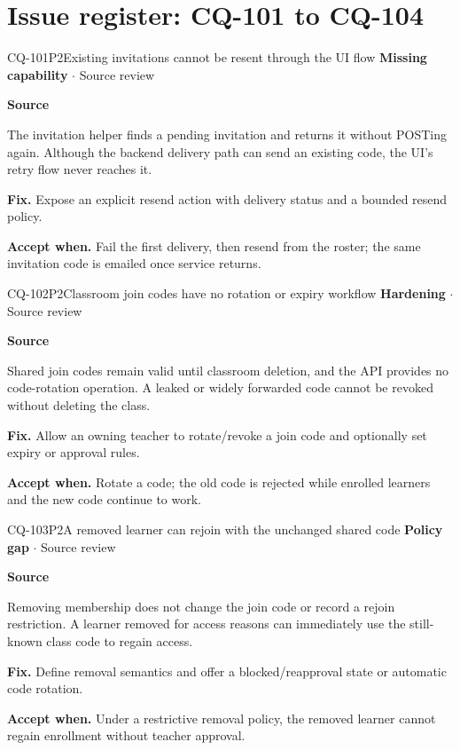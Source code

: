 \section*{Issue register: CQ-101 to CQ-104}
\begin{finding}{CQ-101}{P2}{Existing invitations cannot be resent through the UI flow}
\textbf{Missing capability} $\cdot$ Source review\par
\textbf{Source}\quad{}\par
The invitation helper finds a pending invitation and returns it without POSTing again. Although the backend delivery path can send an existing code, the UI's retry flow never reaches it.\par
\textbf{Fix.} Expose an explicit resend action with delivery status and a bounded resend policy.\par
\textbf{Accept when.} Fail the first delivery, then resend from the roster; the same invitation code is emailed once service returns.
\end{finding}
\begin{finding}{CQ-102}{P2}{Classroom join codes have no rotation or expiry workflow}
\textbf{Hardening} $\cdot$ Source review\par
\textbf{Source}\quad{}\par
Shared join codes remain valid until classroom deletion, and the API provides no code-rotation operation. A leaked or widely forwarded code cannot be revoked without deleting the class.\par
\textbf{Fix.} Allow an owning teacher to rotate/revoke a join code and optionally set expiry or approval rules.\par
\textbf{Accept when.} Rotate a code; the old code is rejected while enrolled learners and the new code continue to work.
\end{finding}
\begin{finding}{CQ-103}{P2}{A removed learner can rejoin with the unchanged shared code}
\textbf{Policy gap} $\cdot$ Source review\par
\textbf{Source}\quad{}\par
Removing membership does not change the join code or record a rejoin restriction. A learner removed for access reasons can immediately use the still-known class code to regain access.\par
\textbf{Fix.} Define removal semantics and offer a blocked/reapproval state or automatic code rotation.\par
\textbf{Accept when.} Under a restrictive removal policy, the removed learner cannot regain enrollment without teacher approval.
\end{finding}
